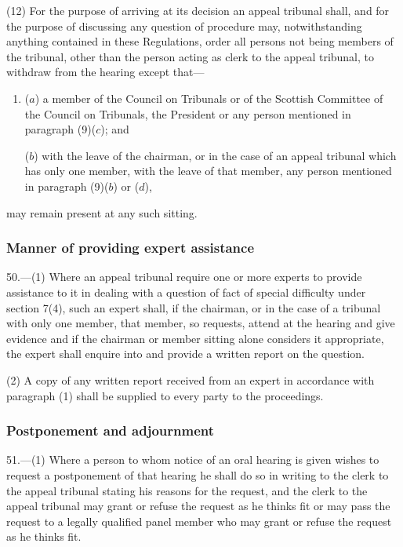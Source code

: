 \documentclass[12pt,a4paper]{article}
\begin{document}
(12) For the purpose of arriving at its decision an appeal tribunal shall, and for the purpose of discussing any question of procedure may, notwithstanding anything contained in these Regulations, order all persons not being members of the tribunal, other than the person acting as clerk to the appeal tribunal, to withdraw from the hearing except that—
\begin{enumerate}\item[]
($a$) a member of the Council on Tribunals or of the Scottish Committee of the Council on Tribunals, the President or any person mentioned in paragraph (9)($c$); and

($b$) with the leave of the chairman, or in the case of an appeal tribunal which has only one member, with the leave of that member, any person mentioned in paragraph (9)($b$) or ($d$),
\end{enumerate}
may remain present at any such sitting.


\subsubsection[50. Manner of providing expert assistance]{Manner of providing expert assistance}

50.—(1) Where an appeal tribunal require one or more experts to provide assistance to it in dealing with a question of fact of special difficulty under section 7(4), such an expert shall, if the chairman, or in the case of a tribunal with only one member, that member, so requests, attend at the hearing and give evidence and if the chairman or member sitting alone considers it appropriate, the expert shall enquire into and provide a written report on the question.

(2) A copy of any written report received from an expert in accordance with paragraph (1) shall be supplied to every party to the proceedings.

\subsubsection[51. Postponement and adjournment]{Postponement and adjournment}

51.—(1) Where a person to whom notice of an oral hearing is given wishes to request a postponement of that hearing he shall do so in writing to the clerk to the appeal tribunal stating his reasons for the request, and the clerk to the appeal tribunal may grant or refuse the request as he thinks fit or may pass the request to a legally qualified panel member who may grant or refuse the request as he thinks fit.
\end{document}
